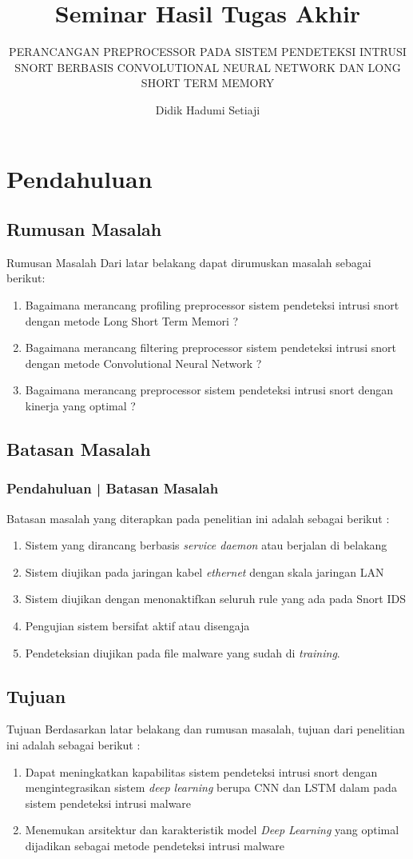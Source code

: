 \documentclass[t]{beamer}
\title{Seminar Hasil Tugas Akhir}
\subtitle{PERANCANGAN PREPROCESSOR PADA SISTEM PENDETEKSI INTRUSI SNORT BERBASIS CONVOLUTIONAL NEURAL NETWORK DAN LONG SHORT TERM MEMORY}
\author{Didik Hadumi Setiaji}
\institute{
Jurusan Teknik Elektro\\
Fakultas Teknik\\
Universitas Mataram
}
\begin{document}
\begin{frame}
	\titlepage
\end{frame}
\section{Pendahuluan}
\subsection{Rumusan Masalah} \label{rumusanmasalah}
\begin{frame}{Rumusan Masalah}
	Dari latar belakang dapat dirumuskan masalah sebagai berikut:
	\begin{enumerate}
		\item Bagaimana merancang profiling preprocessor sistem pendeteksi intrusi snort dengan metode Long Short Term Memori ?
		\item Bagaimana merancang filtering preprocessor sistem pendeteksi intrusi snort dengan metode Convolutional Neural Network ?
		\item Bagaimana merancang preprocessor sistem pendeteksi intrusi snort dengan kinerja yang optimal ?
	\end{enumerate}
\end{frame}
\subsection{Batasan Masalah}
\begin{frame}
	\frametitle{Pendahuluan | Batasan Masalah}
	Batasan masalah yang diterapkan pada penelitian ini adalah sebagai berikut :
	\begin{enumerate}
		\item Sistem yang dirancang berbasis \textit{service daemon} atau berjalan di belakang
		\item Sistem diujikan pada jaringan kabel \textit{ethernet} dengan skala jaringan LAN
		\item Sistem diujikan dengan menonaktifkan seluruh rule yang ada pada Snort IDS
		\item Pengujian sistem bersifat aktif atau disengaja
		\item Pendeteksian diujikan pada file malware yang sudah di \textit{training}.
	\end{enumerate}
\end{frame}
\subsection{Tujuan}
\begin{frame}{Tujuan}
	Berdasarkan latar belakang dan rumusan masalah, tujuan dari penelitian ini adalah sebagai berikut :
	\begin{enumerate}
		\item Dapat meningkatkan kapabilitas sistem pendeteksi intrusi snort dengan mengintegrasikan sistem \textit{deep learning} berupa CNN dan LSTM dalam pada sistem pendeteksi intrusi malware
		\item Menemukan arsitektur dan karakteristik model \textit{Deep Learning} yang optimal dijadikan sebagai metode pendeteksi intrusi malware
	\end{enumerate}
\end{frame}
\end{document}
